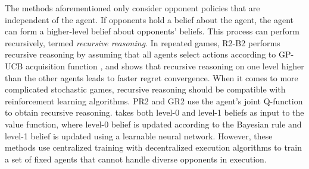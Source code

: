 \documentclass{article}
\begin{document}


The methods aforementioned only consider opponent policies that are independent of the agent. If opponents hold a belief about the agent, the agent can form a higher-level belief about opponents' beliefs. This process can perform recursively, termed \emph{recursive reasoning}.
In repeated games, R2-B2 \citep{dai2020r2} performs recursive reasoning by assuming that all agents select actions according to GP-UCB acquisition function \cite{srinivas2009gaussian}, and shows that recursive reasoning on one level higher than the other agents leads to faster regret convergence. 
When it comes to more complicated stochastic games, recursive reasoning should be compatible with reinforcement learning algorithms. PR2 \citep{wen2018probabilistic} and GR2 \citep{wen2020modeling} use the agent’s joint Q-function to obtain recursive reasoning. \citet{yuan2020emergence} takes both level-0 and level-1 beliefs as input to the value function, where level-0 belief is updated according to the Bayesian rule and level-1 belief is updated using a learnable neural network. However, these methods \cite{wen2018probabilistic,wen2020modeling,yuan2020emergence} use centralized training with decentralized execution algorithms to train a set of fixed agents that cannot handle diverse opponents in execution. %
\end{document}
